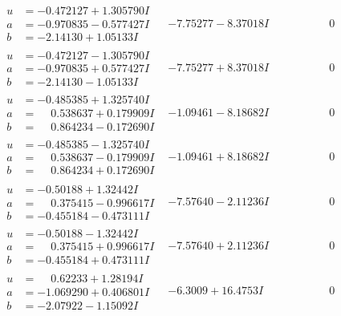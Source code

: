 \documentclass[1p]{elsarticle_modified}
\theoremstyle{definition}
\begin{document}
$$\begin{array}{c|c|c}
\begin{aligned}
u &= -0.472127 + 1.305790 I \\
a &= -0.970835 - 0.577427 I \\
b &= -2.14130 + 1.05133 I\end{aligned}
 & -7.75277 - 8.37018 I & \phantom{-0.000000 } 0 \\ \hline\begin{aligned}
u &= -0.472127 - 1.305790 I \\
a &= -0.970835 + 0.577427 I \\
b &= -2.14130 - 1.05133 I\end{aligned}
 & -7.75277 + 8.37018 I & \phantom{-0.000000 } 0 \\ \hline\begin{aligned}
u &= -0.485385 + 1.325740 I \\
a &= \phantom{-}0.538637 + 0.179909 I \\
b &= \phantom{-}0.864234 - 0.172690 I\end{aligned}
 & -1.09461 - 8.18682 I & \phantom{-0.000000 } 0 \\ \hline\begin{aligned}
u &= -0.485385 - 1.325740 I \\
a &= \phantom{-}0.538637 - 0.179909 I \\
b &= \phantom{-}0.864234 + 0.172690 I\end{aligned}
 & -1.09461 + 8.18682 I & \phantom{-0.000000 } 0 \\ \hline\begin{aligned}
u &= -0.50188 + 1.32442 I \\
a &= \phantom{-}0.375415 - 0.996617 I \\
b &= -0.455184 - 0.473111 I\end{aligned}
 & -7.57640 - 2.11236 I & \phantom{-0.000000 } 0 \\ \hline\begin{aligned}
u &= -0.50188 - 1.32442 I \\
a &= \phantom{-}0.375415 + 0.996617 I \\
b &= -0.455184 + 0.473111 I\end{aligned}
 & -7.57640 + 2.11236 I & \phantom{-0.000000 } 0 \\ \hline\begin{aligned}
u &= \phantom{-}0.62233 + 1.28194 I \\
a &= -1.069290 + 0.406801 I \\
b &= -2.07922 - 1.15092 I\end{aligned}
 & -6.3009 + 16.4753 I & \phantom{-0.000000 } 0 \\ \hline\begin{aligned}

\end{aligned}
\end{array}$$
\end{document}
